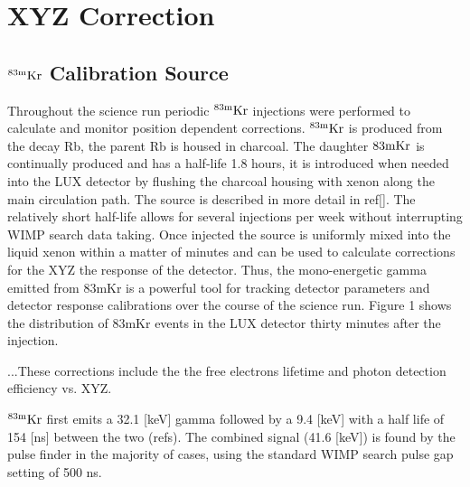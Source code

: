 
\renewcommand{\thechapter}{3}

\chapter{XYZ Correction}

\section{$\rm^{83m}Kr$ Calibration Source}

Throughout the science run periodic $\rm^{83m}Kr$ injections were performed to calculate and monitor position dependent corrections. $\rm ^{83m}Kr$ is produced from the decay Rb, the parent Rb is housed in charcoal. The daughter $\rm{83m}Kr$ is continually produced and has a half-life 1.8 hours, it is introduced when needed into the LUX detector by flushing the charcoal housing with xenon along the main circulation path. The source is described in more detail in ref[]. The relatively short half-life allows for several injections per week without interrupting WIMP search data taking. Once injected the source is uniformly mixed into the liquid xenon within a matter of minutes and can be used to calculate corrections for the XYZ the response of the detector. Thus, the mono-energetic gamma emitted from 83mKr is a powerful tool for tracking detector parameters and detector response calibrations over the course of the science run.
Figure 1 shows the distribution of 83mKr events in the LUX detector thirty minutes after the injection.


...These corrections include the the free electrons lifetime and photon detection efficiency vs. XYZ. 


$\rm^{83m}Kr$ first emits a 32.1 [keV] gamma followed by a 9.4 [keV] with a half life of 154 [ns] between the two (refs). The combined signal (41.6 [keV]) is found by the pulse finder in the majority of cases, using the standard WIMP search pulse gap setting of 500 ns. 
